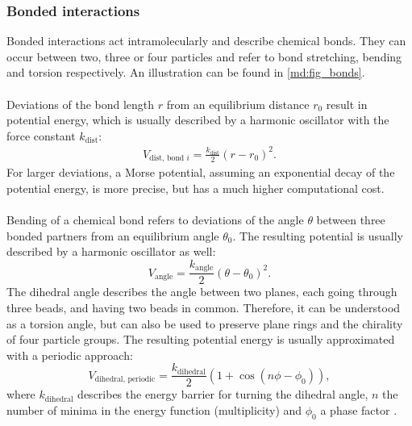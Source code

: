 \subsubsection{Bonded interactions}
Bonded interactions act intramolecularly and describe chemical bonds. They can occur between two, three or four particles and refer to bond stretching, bending and torsion respectively. An illustration can be found in \autoref{md:fig_bonds}.\\
\\
Deviations of the bond length $r$ from an equilibrium distance $r_0$ result in potential energy, which is usually described by a harmonic oscillator with the force constant $k_\text{dist}$:
\begin{align}
V_{\text{dist, bond }i} = \frac{k_{\text{dist}}}{2}\left( r - r_{0} \right)^{2}.
\end{align}
For larger deviations, a Morse potential, assuming an exponential decay of the potential energy, is more precise, but has a much higher computational cost.\\
\\
Bending of a chemical bond refers to deviations of the angle $\theta$ between three bonded partners from an equilibrium angle $\theta_0$. The resulting potential is usually described by a harmonic oscillator as well:
\begin{equation}
V_\text{angle} = \frac{k_\text{angle}}{2}\left( \theta - \theta_0 \right)^{2}.
\end{equation}
The dihedral angle describes the angle between two planes, each going through three beads, and having two beads in common. Therefore, it can be understood as a torsion angle, but can also be used to preserve plane rings and the chirality of four particle groups. The resulting potential energy is usually approximated with a periodic approach:
\begin{equation}
V_{\text{dihedral, periodic}} = \frac{k_\text{dihedral}}{2}\left(1 + \cos\left(n \phi - \phi_0 \right)\right),
\end{equation}
where $k_\text{dihedral}$ describes the energy barrier for turning the dihedral angle, $n$ the number of minima in the energy function (multiplicity) and $\phi_0$ a phase factor \autocite[p. 71-83]{gromacsManual}.
%
%
%
